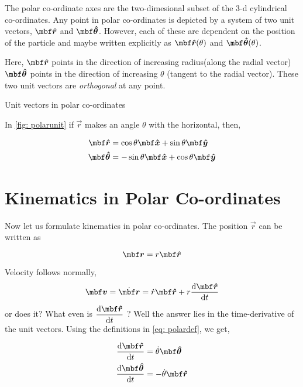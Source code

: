 The polar co-ordinate axes are the two-dimesional subset of the 3-d cylindrical co-ordinates. 
Any point in polar co-ordinates is depicted by a system of two unit vectors, \(\unitv{r}\) and
\(\unitv{\theta}\). However, each of these are {dependent on the position of the particle} and
maybe written explicitly as \(\unitv{r}(\theta)\) and \(\unitv{\theta}(\theta)\).  

Here, \(\unitv{r}\) points in the direction of increasing radius(along the radial vector)
\(\unitv{\theta}\) points in the direction of increasing \(\theta\) (tangent to the radial vector).
These two unit vectors are \emph{orthogonal} at any point. 

\begin{marginfigure}
    \caption{Unit vectors in polar co-ordinates}
    \label{fig: polarunit}
\end{marginfigure}

In \cref{fig: polarunit} if \(\vec{r}\) makes
an angle \(\theta\) with the horizontal, then,

\begin{align}
    \label{eq: polardef}
    \unitv{r} &= \cos \theta \unitv{x} + \sin \theta \unitv{y}\\
    \unitv{\theta} &= -\sin \theta \unitv{x} + \cos \theta \unitv{y}
\end{align}

\section{Kinematics in Polar Co-ordinates}

Now let us formulate kinematics in polar co-ordinates. The position \(\vec{r}\) can be written as

\begin{equation}
    \vec{r} = r \unitv{r}
\end{equation}

\noindent Velocity follows normally, 
\begin{equation}
    \vec{v} = \ndiv{\vec{r}} = \ndiv{r} \unitv{r} + r\dv{\unitv{r}}{t} 
\end{equation}
or does it? What even is \(\displaystyle\dv{\unitv{r}}{t}\) ? Well the answer lies in 
the time-derivative of the unit vectors. Using the definitions in \eqref{eq: polardef}, we get,

\begin{align}
    \dv{\unitv{r}}{t} &= \ndiv{\theta} \unitv{\theta}\\
    \dv{\unitv{\theta}}{t} &= -\ndiv{\theta} \unitv{r}
\end{align}

